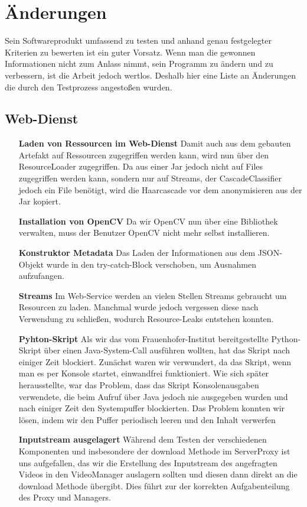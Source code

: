 \chapter{Änderungen} \label{Changelog}
Sein Softwareprodukt umfassend zu testen und anhand genau festgelegter Kriterien zu bewerten ist ein guter Vorsatz. Wenn man die gewonnen Informationen nicht zum Anlass nimmt, sein Programm zu ändern und zu verbessern, ist die Arbeit jedoch wertlos. Deshalb hier eine Liste an Änderungen die durch den Testprozess angestoßen wurden.
\section{Web-Dienst}
\begin{itemize}
\item[\textbf{Laden von Ressourcen im Web-Dienst}] Damit auch aus dem gebauten Artefakt auf Ressourcen zugegriffen werden kann, wird nun über den ResourceLoader zugegriffen. Da aus einer Jar jedoch nicht auf Files zugegriffen werden kann, sondern nur auf Streams, der CascadeClassifier jedoch ein File benötigt, wird die Haarcascade vor dem anonymisieren aus der Jar kopiert.
\item[\textbf{Installation von OpenCV}] Da wir OpenCV nun über eine Bibliothek verwalten, muss der Benutzer OpenCV nicht mehr selbst installieren.
\item[\textbf{Konstruktor Metadata}] Das Laden der Informationen aus dem JSON-Objekt wurde in den try-catch-Block verschoben, um Ausnahmen aufzufangen.
\item[\textbf{Streams}] Im Web-Service werden an vielen Stellen Streams gebraucht um Resourcen zu laden. Manchmal wurde jedoch vergessen diese nach Verwendung zu schließen, wodurch Resource-Leaks entstehen konnten.
\item[\textbf{Pyhton-Skript}] Als wir das vom Frauenhofer-Institut bereitgestellte Python-Skript über einen Java-System-Call ausführen wollten, hat das Skript nach einiger Zeit blockiert. Zunächst waren wir verwundert, da das Skript, wenn man es per Konsole startet, einwandfrei funktioniert. Wie sich später herausstellte, war das Problem, dass das Skript Konsolenausgaben verwendete, die beim Aufruf über Java jedoch nie ausgegeben wurden und nach einiger Zeit den Systempuffer blockierten. Das Problem konnten wir lösen, indem wir den Puffer periodisch leeren und den Inhalt verwerfen
\item[\textbf{Inputstream ausgelagert}] Während dem Testen der verschiedenen Komponenten und insbesondere der download Methode im ServerProxy ist uns aufgefallen, das wir die Erstellung des Inputstream des angefragten Videos in den VideoManager auslagern sollten und diesen dann direkt an die download Methode übergibt. Dies führt zur der korrekten Aufgabenteilung des Proxy und Managers.
\end{itemize}
